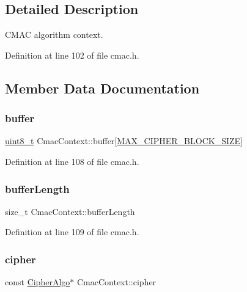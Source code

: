 \subsection{Detailed Description}
C\+M\+AC algorithm context. 

Definition at line 102 of file cmac.\+h.



\subsection{Member Data Documentation}
\mbox{\label{structCmacContext_ab4ba44f829299a64e9cccfc88ee1ee78}} 
\subsubsection{\texorpdfstring{buffer}{buffer}}
{\footnotesize\ttfamily \hyperlink{stdint_8h_aba7bc1797add20fe3efdf37ced1182c5}{uint8\+\_\+t} Cmac\+Context\+::buffer\mbox{[}\hyperlink{cyclone__crypto_2core_2crypto_8h_ad7d23a73335aef1d701df177a8f92b80}{M\+A\+X\+\_\+\+C\+I\+P\+H\+E\+R\+\_\+\+B\+L\+O\+C\+K\+\_\+\+S\+I\+ZE}\mbox{]}}



Definition at line 108 of file cmac.\+h.

\mbox{\label{structCmacContext_a0606cddcb5373f144b550578a441af42}} 
\subsubsection{\texorpdfstring{buffer\+Length}{bufferLength}}
{\footnotesize\ttfamily size\+\_\+t Cmac\+Context\+::buffer\+Length}



Definition at line 109 of file cmac.\+h.

\mbox{\label{structCmacContext_aaec26a5f11f59e011e72b94c18ca8b81}} 
\subsubsection{\texorpdfstring{cipher}{cipher}}
{\footnotesize\ttfamily const \hyperlink{structCipherAlgo}{Cipher\+Algo}$\ast$ Cmac\+Context\+::cipher}



